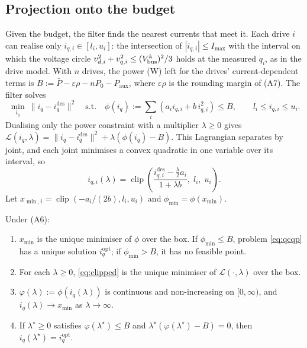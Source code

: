 \subsection{Projection onto the budget}
Given the budget, the filter finds the nearest currents that meet it. Each drive $i$ can realise only $i_{q,i}\in[l_i,u_i]$: the intersection of $|i_{q,i}|\le I_{\max}$ with the interval on which the voltage circle $v_{d,i}^2+v_{q,i}^2 \le (V_{\mathrm{bus}}^k)^2/3$ holds at the measured $\dot q_i$, as in the drive model. With $n$ drives, the power (W) left for the drives' current-dependent terms is $B := \bar P - \varepsilon\rho - nP_0 - P_{\mathrm{aux}}$, where $\varepsilon\rho$ is the rounding margin of (A7). The filter solves
\begin{equation}
\min_{i_q}\ \|i_q - i_q^{\mathrm{des}}\|^2 \quad \text{s.t.}\quad \phi(i_q) := \sum_i \left(a_i i_{q,i} + b\, i_{q,i}^2\right) \le B, \qquad l_i \le i_{q,i} \le u_i .
\label{eq:qcqp}
\end{equation}
Dualising only the power constraint with a multiplier $\lambda\ge0$ gives $\mathcal{L}(i_q,\lambda) = \|i_q-i_q^{\mathrm{des}}\|^2 + \lambda(\phi(i_q)-B)$. This Lagrangian separates by joint, and each joint minimises a convex quadratic in one variable over its interval, so
\begin{equation}
i_{q,i}(\lambda) = \operatorname{clip}\!\left(\frac{i^{\mathrm{des}}_{q,i} - \tfrac{\lambda}{2}a_i}{1+\lambda b},\; l_i,\; u_i\right).
\label{eq:clipped}
\end{equation}
Let $x_{\min,i} = \operatorname{clip}(-a_i/(2b), l_i, u_i)$ and $\phi_{\min} = \phi(x_{\min})$.
\begin{lemma}\label{lem:proj}
Under (A6):
\begin{enumerate}
\item[(a)] $x_{\min}$ is the unique minimiser of $\phi$ over the box. If $\phi_{\min}\le B$, problem \eqref{eq:qcqp} has a unique solution $i_q^{\mathrm{opt}}$; if $\phi_{\min}>B$, it has no feasible point.
\item[(b)] For each $\lambda\ge0$, \eqref{eq:clipped} is the unique minimiser of $\mathcal{L}(\cdot,\lambda)$ over the box.
\item[(c)] $\varphi(\lambda) := \phi(i_q(\lambda))$ is continuous and non-increasing on $[0,\infty)$, and $i_q(\lambda)\to x_{\min}$ as $\lambda\to\infty$.
\item[(d)] If $\lambda^\star\ge0$ satisfies $\varphi(\lambda^\star)\le B$ and $\lambda^\star(\varphi(\lambda^\star)-B)=0$, then $i_q(\lambda^\star) = i_q^{\mathrm{opt}}$.
\end{enumerate}
\end{lemma}
